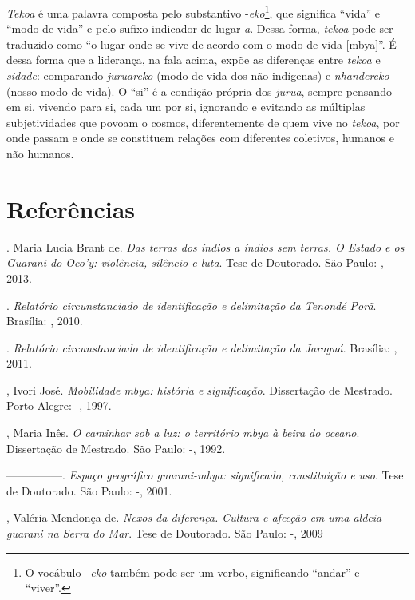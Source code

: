 {\emph{Tekoa} é uma palavra composta pelo substantivo -\emph{eko}\footnote{O vocábulo
\emph{--eko} também pode ser um verbo, significando ``andar'' e ``viver''.}, que
significa ``vida'' e ``modo de vida'' e pelo sufixo indicador de lugar \emph{a}.
Dessa forma, \emph{tekoa} pode ser traduzido como ``o lugar onde se vive de
acordo com o modo de vida [mbya]''. É dessa forma que a liderança, na
fala acima, expõe as diferenças entre \emph{tekoa} e \emph{sidade}: comparando
\emph{juruareko} (modo de vida dos não indígenas) e \emph{nhandereko} (nosso modo de
vida). O ``si'' é a condição própria dos \emph{jurua}, sempre pensando em si,
vivendo para si, cada um por si, ignorando e evitando as múltiplas
subjetividades que povoam o cosmos, diferentemente de quem vive no
\emph{tekoa}, por onde passam e onde se constituem relações com diferentes
coletivos, humanos e não humanos.

\section{Referências} 

\begin{Parskip}
. Maria Lucia Brant de. \emph{Das terras dos índios a índios sem
terras. O Estado e os Guarani do Oco’y: violência, silêncio e luta}.
Tese de Doutorado. São Paulo: , 2013.

. \emph{Relatório circunstanciado de identificação e delimitação da 
Tenondé Porã}. Brasília: , 2010.

. \emph{Relatório circunstanciado de identificação e delimitação da 
Jaraguá}. Brasília: , 2011.

, Ivori José. \emph{Mobilidade mbya: história e significação}.
Dissertação de Mestrado. Porto Alegre: -, 1997.

, Maria Inês. \emph{O caminhar sob a luz: o território mbya à beira do
oceano}. Dissertação de Mestrado. São Paulo: -, 1992. 

—————. \emph{Espaço geográfico guarani-mbya: significado, constituição e
uso}. Tese de Doutorado. São Paulo: -, 2001.

, Valéria Mendonça de. \emph{Nexos da diferença. Cultura e afecção em
uma aldeia guarani na Serra do Mar}. Tese de Doutorado. São Paulo:
-, 2009


\end{Parskip}}
